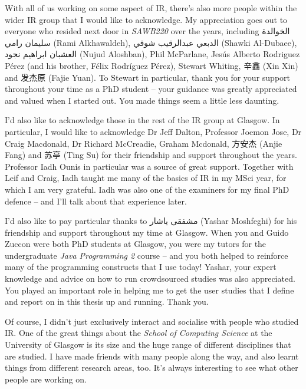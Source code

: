 \begin{preamble}
With all of us working on some aspect of IR, there's also more people within the wider IR group that I would like to acknowledge. My appreciation goes out to everyone who resided next door in \emph{SAWB220} over the years, including {\arabicfont  الخوالدة سليمان رامي} (Rami Alkhawaldeh), {\arabicfont الدبعي عبدالرقيب شوقي} (Shawki Al-Dubaee), {\arabicfont العشبان ابراهيم نجود} (Nujud Aloshban), Phil McParlane, Jes\'{u}s Alberto Rodriguez P\'{e}rez (and his brother, F\'{e}lix Rodr\'{i}guez P\'{e}rez), Stewart Whiting, {\asianfont 辛鑫} (Xin Xin) and {\asianfont 发杰原} (Fajie Yuan). To Stewart in particular, thank you for your support throughout your time as a PhD student -- your guidance was greatly appreciated and valued when I started out. You made things seem a little less daunting.

I'd also like to acknowledge those in the rest of the IR group at Glasgow. In particular, I would like to acknowledge Dr Jeff Dalton, Professor Joemon Jose, Dr Craig Macdonald, Dr Richard McCreadie, Graham Mcdonald, {\asianfont 方安杰} (Anjie Fang) and {\asianfont 苏亭} (Ting Su) for their friendship and support throughout the years. Professor Iadh Ounis in particular was a source of great support. Together with Leif and Craig, Iadh taught me many of the basics of IR in my MSci year, for which I am very grateful. Iadh was also one of the examiners for my final PhD defence -- and I'll talk about that experience later.

I'd also like to pay particular thanks to {\farsifont مشفقى ياشار} (Yashar Moshfeghi) for his friendship and support throughout my time at Glasgow. When you and Guido Zuccon were both PhD students at Glasgow, you were my tutors for the undergraduate \emph{Java Programming 2} course -- and you both helped to reinforce many of the programming constructs that I use today! Yashar, your expert knowledge and advice on how to run crowdsourced studies was also appreciated. You played an important role in helping me to get the user studies that I define and report on in this thesis up and running. Thank you.

Of course, I didn't just exclusively interact and socialise with people who studied IR. One of the great things about the \emph{School of Computing Science} at the University of Glasgow is its size and the huge range of different disciplines that are studied. I have made friends with many people along the way, and also learnt things from different research areas, too. It's always interesting to see what other people are working on.


\end{preamble}
